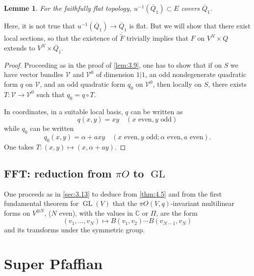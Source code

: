 \documentclass[11pt,a4paper]{article}
\theoremstyle{plain}
\newtheorem{lemma}[theorem]{Lemme}
\theoremstyle{definition}
\DeclareMathOperator{\GL}{GL}
\newcommand{\C}{\mathbb{C}}
\begin{document}
\begin{lemma}\label{lem:4.8}
For the faithfully flat topology, $u^{-1}(\overline{Q}_1) \subset E$ covers $\overline{Q}_1$.
\end{lemma}

Here, it is not true that $u^{-1}(\overline{Q}_1) \to \overline{Q}_1$ is flat. But we will show that there exist local sections, so that the existence of $\overline{\widetilde{F}}$ trivially implies that $F$ on $V^N \times Q$ extends to $V^N \times \overline{Q}_1$.

\begin{proof}
Proceeding as in the proof of \ref{lem:3.9}, one has to show that if on $S$ we have vector bundles $\mathcal{V}$ and $\mathcal{V}^0$ of dimension $1|1$, an odd nondegenerate quadratic form $q$ on $\mathcal{V}$, and an odd quadratic form $q_0$ on $\mathcal{V}^0$, then locally on $S$, there exists $T : \mathcal{V} \to \mathcal{V}^0$ such that $q_0 = q \circ T$.

In coordinates, in a suitable local basis, $q$ can be written as
\[
q(x,y) = xy \quad (x \text{ even}, y \text{ odd})
\]
while $q_0$ can be written
\[
q_0(x,y) = \alpha + axy \quad (x \text{ even}, y \text{ odd}; \alpha \text{ even}, a \text{ even}).
\]
One takes $T : (x,y) \mapsto (x, \alpha + ay)$.
\end{proof}

\subsection{FFT: reduction from $\pi O$ to $\GL$}
One proceeds as in \ref{sec:3.13} to deduce from \ref{thm:4.5} and from the first fundamental theorem for $\GL(V)$ that the $\pi O(V,q)$-invariant multilinear forms on $V^{\otimes N}$, ($N$ even), with the values in $\C$ or $\Pi$, are the form
\[
(v_1,\dots,v_N) \mapsto B(v_1, v_2) \cdots B(v_{N-1}, v_N)
\]
and its transforms under the symmetric group.

\section{Super Pfaffian}
\end{document}
